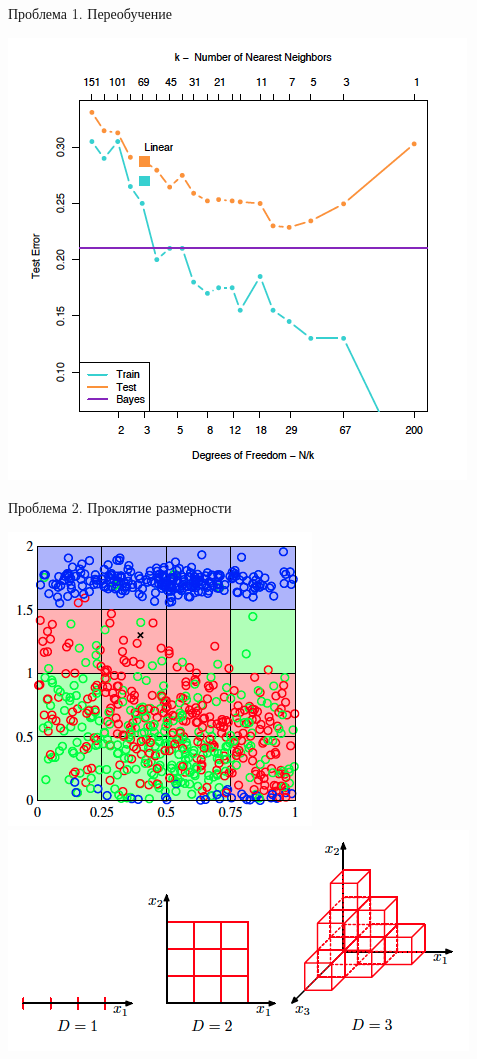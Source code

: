 \documentclass[aspectratio=169]{beamer}
\begin{document}
\begin{frame}{Проблема 1. Переобучение}
\begin{center}
\includegraphics[scale=0.3]{images/knn_tt.png}

\end{center}

\end{frame}

\begin{frame}{Проблема 2. Проклятие размерности}

\begin{center}
\includegraphics[scale=0.3]{images/pts.png}
\includegraphics[scale=0.4]{images/curse.png}
\end{center}

\end{frame}
\end{document}
